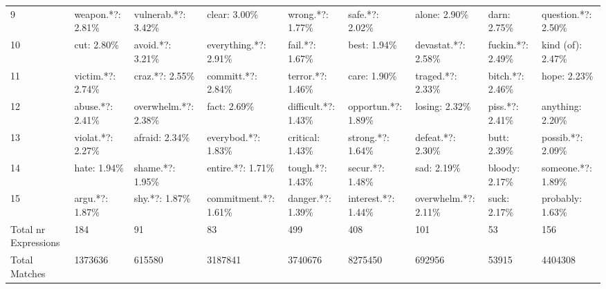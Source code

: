 \begin{tabular}{lllllllll}
9                    &           weapon.*?: 2.81\% &   vulnerab.*?: 3.42\% &          clear: 3.00\% &      wrong.*?: 1.77\% &      safe.*?: 2.02\% &          alone: 2.90\% &               darn: 2.75\% &   question.*?: 2.50\% \\
10                   &                 cut: 2.80\% &      avoid.*?: 3.21\% &  everything.*?: 2.91\% &       fail.*?: 1.67\% &         best: 1.94\% &    devastat.*?: 2.58\% &          fuckin.*?: 2.49\% &     kind (of): 2.47\% \\
11                   &           victim.*?: 2.74\% &       craz.*?: 2.55\% &     committ.*?: 2.84\% &     terror.*?: 1.46\% &         care: 1.90\% &      traged.*?: 2.33\% &           bitch.*?: 2.46\% &          hope: 2.23\% \\
12                   &            abuse.*?: 2.41\% &  overwhelm.*?: 2.38\% &           fact: 2.69\% &  difficult.*?: 1.43\% &  opportun.*?: 1.89\% &         losing: 2.32\% &            piss.*?: 2.41\% &      anything: 2.20\% \\
13                   &           violat.*?: 2.27\% &        afraid: 2.34\% &    everybod.*?: 1.83\% &      critical: 1.43\% &    strong.*?: 1.64\% &      defeat.*?: 2.30\% &               butt: 2.39\% &     possib.*?: 2.09\% \\
14                   &                hate: 1.94\% &      shame.*?: 1.95\% &      entire.*?: 1.71\% &      tough.*?: 1.43\% &     secur.*?: 1.48\% &            sad: 2.19\% &             bloody: 2.17\% &    someone.*?: 1.89\% \\
15                   &             argu.*?: 1.87\% &        shy.*?: 1.87\% &  commitment.*?: 1.61\% &     danger.*?: 1.39\% &  interest.*?: 1.44\% &   overwhelm.*?: 2.11\% &               suck: 2.17\% &      probably: 1.63\% \\
Total nr Expressions &                         184 &                    91 &                     83 &                   499 &                  408 &                    101 &                         53 &                   156 \\
Total Matches        &                     1373636 &                615580 &                3187841 &               3740676 &              8275450 &                 692956 &                      53915 &               4404308 \\
\bottomrule
\end{tabular}

